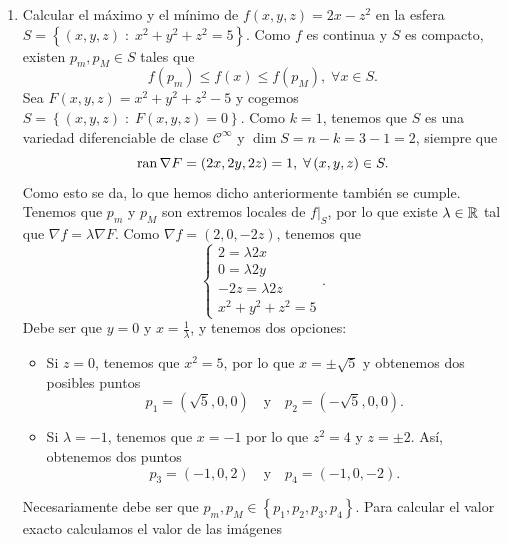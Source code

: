 \begin{eg}
\begin{enumerate}
	\item Calcular el máximo y el mínimo de $\displaystyle f\left(x,y,z\right) = 2x-z^{2} $ en la esfera $\displaystyle S = \left\{ \left(x,y,z\right) \; : \; x^{2} +y^{2} + z^{2} = 5\right\}  $. Como $\displaystyle f $ es continua y $\displaystyle S $ es compacto, existen $\displaystyle p_{m}, p_{M} \in S $ tales que 
		\[f\left(p_{m}\right) \leq f\left(x\right) \leq f\left(p_{M}\right), \; \forall x \in S .\]
		Sea $\displaystyle F\left(x,y,z\right) = x^{2} +y^{2} + z^{2} -5 $ y cogemos $\displaystyle S = \left\{ \left(x,y,z\right) \; : \; F\left(x,y,z\right) = 0\right\}  $. Como $\displaystyle k = 1 $, tenemos que $\displaystyle S $ es una variedad diferenciable de clase $\displaystyle \mathcal{C}^{\infty} $ y $\displaystyle \dim S = n - k = 3 - 1 = 2$, siempre que 
		\[\operatorname{ran}\nabla F = \left(2x, 2y, 2z\right) = 1, \; \forall \left(x,y,z\right) \in S .\]
	Como esto se da, lo que hemos dicho anteriormente también se cumple. Tenemos que $\displaystyle p_{m} $ y $\displaystyle p_{M} $ son extremos locales de $\displaystyle f|_{S} $, por lo que existe $\displaystyle \lambda \in \mathbb{R} $ tal que $\displaystyle \nabla f = \lambda \nabla F $. Como $\displaystyle \nabla f = \left(2, 0, -2z\right) $, tenemos que
	\[
	\begin{cases}
	2 = \lambda 2x \\
	0 = \lambda 2y \\
	-2z = \lambda 2z \\
	x^{2} +y^{2} +z^{2} = 5
	\end{cases}
	.\]
Debe ser que $\displaystyle y = 0 $ y $\displaystyle x = \frac{1}{\lambda } $, y tenemos dos opciones:
\begin{itemize}
\item Si $\displaystyle z = 0 $, tenemos que $\displaystyle x^{2} = 5 $, por lo que $\displaystyle x = \pm \sqrt{5} $ y obtenemos dos posibles puntos
	\[p_{1} = \left(\sqrt{5}, 0, 0\right) \quad \text{y} \quad p_{2} =\left(-\sqrt{5}, 0, 0\right) .\]
\item Si $\displaystyle \lambda = -1 $, tenemos que $\displaystyle x = - 1 $ por lo que $\displaystyle z^{2} = 4 $ y $\displaystyle z = \pm 2 $. Así, obtenemos dos puntos
	\[p_{3} = \left(-1, 0, 2\right) \quad \text{y} \quad p_{4} = \left(-1,0,-2\right) .\]
\end{itemize}
Necesariamente debe ser que $\displaystyle p_{m}, p_{M} \in \left\{ p_{1}, p_{2}, p_{3}, p_{4}\right\}  $. Para calcular el valor exacto calculamos el valor de las imágenes

\end{enumerate}
\end{eg}
